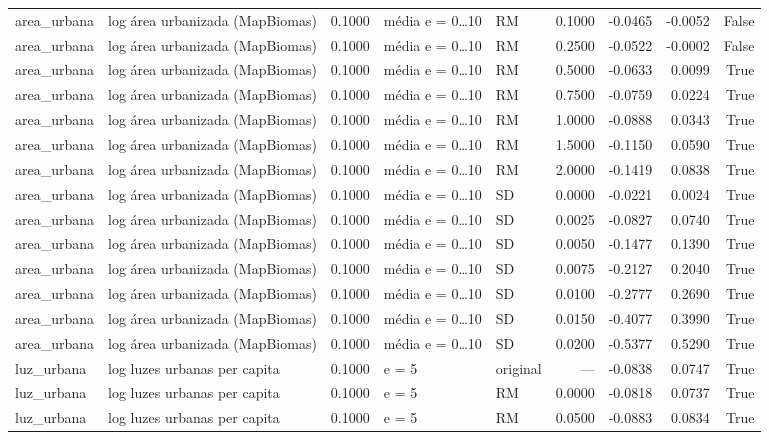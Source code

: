 \begin{table}
{\begin{tabular}{llrllrrrr}
area\_urbana & log área urbanizada (MapBiomas) & 0.1000 & média e = 0…10 & RM & 0.1000 & -0.0465 & -0.0052 & False \\
area\_urbana & log área urbanizada (MapBiomas) & 0.1000 & média e = 0…10 & RM & 0.2500 & -0.0522 & -0.0002 & False \\
area\_urbana & log área urbanizada (MapBiomas) & 0.1000 & média e = 0…10 & RM & 0.5000 & -0.0633 & 0.0099 & True \\
area\_urbana & log área urbanizada (MapBiomas) & 0.1000 & média e = 0…10 & RM & 0.7500 & -0.0759 & 0.0224 & True \\
area\_urbana & log área urbanizada (MapBiomas) & 0.1000 & média e = 0…10 & RM & 1.0000 & -0.0888 & 0.0343 & True \\
area\_urbana & log área urbanizada (MapBiomas) & 0.1000 & média e = 0…10 & RM & 1.5000 & -0.1150 & 0.0590 & True \\
area\_urbana & log área urbanizada (MapBiomas) & 0.1000 & média e = 0…10 & RM & 2.0000 & -0.1419 & 0.0838 & True \\
area\_urbana & log área urbanizada (MapBiomas) & 0.1000 & média e = 0…10 & SD & 0.0000 & -0.0221 & 0.0024 & True \\
area\_urbana & log área urbanizada (MapBiomas) & 0.1000 & média e = 0…10 & SD & 0.0025 & -0.0827 & 0.0740 & True \\
area\_urbana & log área urbanizada (MapBiomas) & 0.1000 & média e = 0…10 & SD & 0.0050 & -0.1477 & 0.1390 & True \\
area\_urbana & log área urbanizada (MapBiomas) & 0.1000 & média e = 0…10 & SD & 0.0075 & -0.2127 & 0.2040 & True \\
area\_urbana & log área urbanizada (MapBiomas) & 0.1000 & média e = 0…10 & SD & 0.0100 & -0.2777 & 0.2690 & True \\
area\_urbana & log área urbanizada (MapBiomas) & 0.1000 & média e = 0…10 & SD & 0.0150 & -0.4077 & 0.3990 & True \\
area\_urbana & log área urbanizada (MapBiomas) & 0.1000 & média e = 0…10 & SD & 0.0200 & -0.5377 & 0.5290 & True \\
luz\_urbana & log luzes urbanas per capita & 0.1000 & e = 5 & original & — & -0.0838 & 0.0747 & True \\
luz\_urbana & log luzes urbanas per capita & 0.1000 & e = 5 & RM & 0.0000 & -0.0818 & 0.0737 & True \\
luz\_urbana & log luzes urbanas per capita & 0.1000 & e = 5 & RM & 0.0500 & -0.0883 & 0.0834 & True \\

\end{tabular}}
\end{table}
